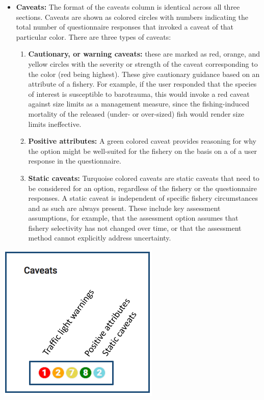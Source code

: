 \documentclass[
  11pt,
]{book}
\providecommand{\tightlist}{%
  \setlength{\itemsep}{0pt}\setlength{\parskip}{0pt}}
\begin{document}
\begin{itemize}
\item
  \textbf{Caveats:} The format of the caveats column is identical across all three sections. Caveats are shown as colored circles with numbers indicating the total number of questionnaire responses that invoked a caveat of that particular color. There are three types of caveats:

  \begin{enumerate}
  \def\labelenumi{\arabic{enumi}.}
  \tightlist
  \item
    \textbf{Cautionary, or warning caveats:} these are marked as red, orange, and yellow circles with the severity or strength of the caveat corresponding to the color (red being highest). These give cautionary guidance based on an attribute of a fishery. For example, if the user responded that the species of interest is susceptible to barotrauma, this would invoke a red caveat against size limits as a management measure, since the fishing-induced mortality of the released (under- or over-sized) fish would render size limits ineffective.
  \item
    \textbf{Positive attributes:} A green colored caveat provides reasoning for why the option might be well-suited for the fishery on the basis on a of a user response in the questionnaire.
  \item
    \textbf{Static caveats:} Turquoise colored caveats are static caveats that need to be considered for an option, regardless of the fishery or the questionnaire responses. A static caveat is independent of specific fishery circumstances and as such are always present. These include key assessment assumptions, for example, that the assessment option assumes that fishery selectivity has not changed over time, or that the assessment method cannot explicitly address uncertainty.
  \end{enumerate}
\end{itemize}

\begin{center}\includegraphics[width=0.35\linewidth]{images/caveats} \end{center}
\end{document}
